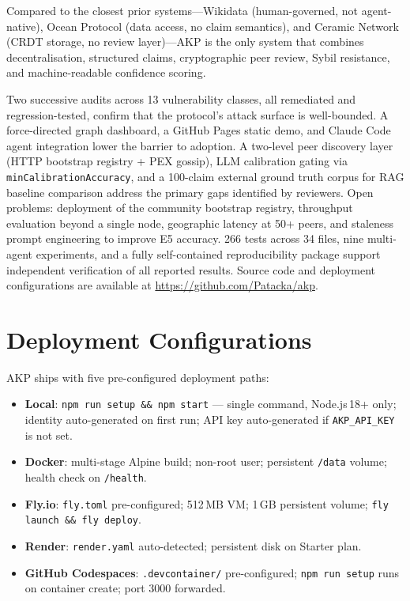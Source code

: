 \documentclass[10pt,twocolumn]{article}
\begin{document}
Compared to the closest prior systems—Wikidata (human-governed, not
agent-native), Ocean Protocol (data access, no claim semantics), and Ceramic
Network (CRDT storage, no review layer)—AKP is the only system that combines
decentralisation, structured claims, cryptographic peer review, Sybil
resistance, and machine-readable confidence scoring.

Two successive audits across 13 vulnerability classes, all remediated and
regression-tested, confirm that the protocol's attack surface is well-bounded.
A force-directed graph dashboard, a GitHub Pages static demo, and Claude Code
agent integration lower the barrier to adoption. A two-level peer discovery
layer (HTTP bootstrap registry + PEX gossip), LLM calibration gating via
\texttt{minCalibrationAccuracy}, and a 100-claim external ground truth corpus
for RAG baseline comparison address the primary gaps identified by reviewers.
Open problems: deployment of the community bootstrap registry, throughput
evaluation beyond a single node, geographic latency at 50+ peers, and
staleness prompt engineering to improve E5 accuracy.
266 tests across 34 files, nine multi-agent experiments, and a fully
self-contained reproducibility package support independent verification of all
reported results. Source code and deployment configurations are available at
\url{https://github.com/Patacka/akp}.

\appendix

\section{Deployment Configurations}
\label{app:deployment}

AKP ships with five pre-configured deployment paths:

\begin{itemize}[noitemsep,topsep=2pt]
  \item \textbf{Local}: \texttt{npm run setup \&\& npm start} — single command,
        Node.js\,18+ only; identity auto-generated on first run; API key
        auto-generated if \texttt{AKP\_API\_KEY} is not set.
  \item \textbf{Docker}: multi-stage Alpine build; non-root user; persistent
        \texttt{/data} volume; health check on \texttt{/health}.
  \item \textbf{Fly.io}: \texttt{fly.toml} pre-configured; 512\,MB VM;
        1\,GB persistent volume; \texttt{fly launch \&\& fly deploy}.
  \item \textbf{Render}: \texttt{render.yaml} auto-detected; persistent disk
        on Starter plan.
  \item \textbf{GitHub Codespaces}: \texttt{.devcontainer/} pre-configured;
        \texttt{npm run setup} runs on container create; port 3000 forwarded.
\end{itemize}
\end{document}

